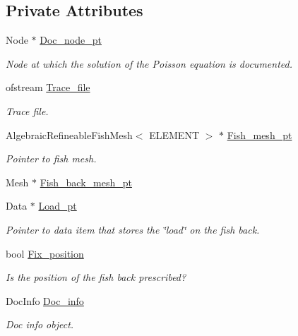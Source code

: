\subsection*{Private Attributes}
\begin{DoxyCompactItemize}
\item 
Node $\ast$ \hyperlink{classRefineableFishPoissonProblem_afa7a846c34391fdfbc1a7cefe268152c}{Doc\+\_\+node\+\_\+pt}
\begin{DoxyCompactList}\small\item\em Node at which the solution of the Poisson equation is documented. \end{DoxyCompactList}\item 
ofstream \hyperlink{classRefineableFishPoissonProblem_aa358e2b0fa91780bdca32ae4676717ff}{Trace\+\_\+file}
\begin{DoxyCompactList}\small\item\em Trace file. \end{DoxyCompactList}\item 
Algebraic\+Refineable\+Fish\+Mesh$<$ E\+L\+E\+M\+E\+NT $>$ $\ast$ \hyperlink{classRefineableFishPoissonProblem_af915f09b6e4ae2f4ded2ad1a25ed7f01}{Fish\+\_\+mesh\+\_\+pt}
\begin{DoxyCompactList}\small\item\em Pointer to fish mesh. \end{DoxyCompactList}\item 
Mesh $\ast$ \hyperlink{classRefineableFishPoissonProblem_adcb3831cd9c21ec454ca787ced5d9db6}{Fish\+\_\+back\+\_\+mesh\+\_\+pt}
\item 
Data $\ast$ \hyperlink{classRefineableFishPoissonProblem_ae4a4e592320bbe9bfbee52be7dfecfaa}{Load\+\_\+pt}
\begin{DoxyCompactList}\small\item\em Pointer to data item that stores the \char`\"{}load\char`\"{} on the fish back. \end{DoxyCompactList}\item 
bool \hyperlink{classRefineableFishPoissonProblem_a51c10ea7cbf4ab61fd953f011f72a1c4}{Fix\+\_\+position}
\begin{DoxyCompactList}\small\item\em Is the position of the fish back prescribed? \end{DoxyCompactList}\item 
Doc\+Info \hyperlink{classRefineableFishPoissonProblem_ad6d382f1d38425323627f34e0559b28f}{Doc\+\_\+info}
\begin{DoxyCompactList}\small\item\em Doc info object. \end{DoxyCompactList}\end{DoxyCompactItemize}


